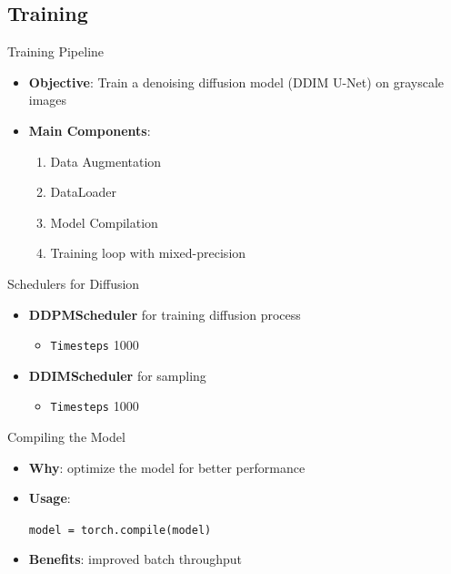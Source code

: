 \subsection{Training}
\begin{frame}{Training Pipeline}
    \begin{itemize}
        \item \textbf{Objective}: Train a denoising diffusion model (DDIM U-Net) on grayscale images
        \item \textbf{Main Components}:
              \begin{enumerate}
                  \item Data Augmentation
                  \item DataLoader
                  \item Model Compilation
                  \item Training loop with mixed-precision
              \end{enumerate}
    \end{itemize}
\end{frame}

\begin{frame}{Schedulers for Diffusion}
    \begin{itemize}
        \item \textbf{DDPMScheduler} for training diffusion process
              \begin{itemize}
                  \item \texttt{Timesteps} 1000
              \end{itemize}
        \item \textbf{DDIMScheduler} for sampling
              \begin{itemize}
                  \item \texttt{Timesteps} 1000
              \end{itemize}
    \end{itemize}
\end{frame}

\begin{frame}{Compiling the Model}
    \begin{itemize}
        \item \textbf{Why}: optimize the model for better performance
        \item \textbf{Usage}:
              \begin{semiverbatim}
                  \texttt{model = torch.compile(model)}
              \end{semiverbatim}
        \item \textbf{Benefits}: improved batch throughput
    \end{itemize}
\end{frame}


